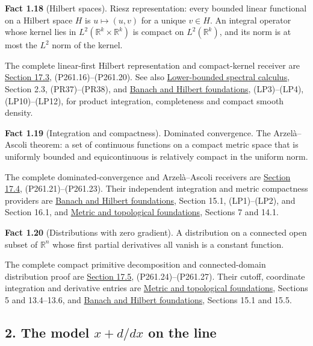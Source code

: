 \documentclass[
  11pt,
]{article}
\begin{document}
\textbf{Fact 1.18} (Hilbert spaces). Riesz representation: every bounded
linear functional on a Hilbert space \(H\) is \(u\mapsto(u,v)\) for a
unique \(v\in H\). An integral operator whose kernel lies in
\(L^2(\mathbb R^k\times\mathbb R^k)\) is compact on
\(L^2(\mathbb R^k)\), and its norm is at most the \(L^2\) norm of the
kernel.

The complete linear-first Hilbert representation and compact-kernel
receiver are \hyperref[AN03-BOTT-P261-3]{Section 17.3},
(P261.16)--(P261.20). See also
\href{lower-bounded-spectral-calculus.pdf}{Lower-bounded spectral
calculus}, Section 2.3, (PR37)--(PR38), and
\href{banach-foundation-bridges.pdf}{Banach and Hilbert foundations},
(LP3)--(LP4), (LP10)--(LP12), for product integration, completeness and
compact smooth density.

\textbf{Fact 1.19} (Integration and compactness). Dominated convergence.
The Arzelà--Ascoli theorem: a set of continuous functions on a compact
metric space that is uniformly bounded and equicontinuous is relatively
compact in the uniform norm.

The complete dominated-convergence and Arzelà--Ascoli receivers are
\hyperref[AN03-BOTT-P261-4]{Section 17.4}, (P261.21)--(P261.23). Their
independent integration and metric compactness providers are
\href{banach-foundation-bridges.pdf}{Banach and Hilbert foundations},
Section 15.1, (LP1)--(LP2), and Section 16.1, and
\href{metric-foundation-bridges.pdf}{Metric and topological foundations},
Sections 7 and 14.1.

\textbf{Fact 1.20} (Distributions with zero gradient). A distribution on
a connected open subset of \(\mathbb R^n\) whose first partial
derivatives all vanish is a constant function.

The complete compact primitive decomposition and connected-domain
distribution proof are \hyperref[AN03-BOTT-P261-5]{Section 17.5},
(P261.24)--(P261.27). Their cutoff, coordinate integration and
derivative entries are \href{metric-foundation-bridges.pdf}{Metric and
topological foundations}, Sections 5 and 13.4--13.6, and
\href{banach-foundation-bridges.pdf}{Banach and Hilbert foundations},
Sections 15.1 and 15.5.

\subsection{\texorpdfstring{2. The model \(x+d/dx\) on the
line}{2. The model x+d/dx on the line}}\label{the-model-xddx-on-the-line}
\end{document}
